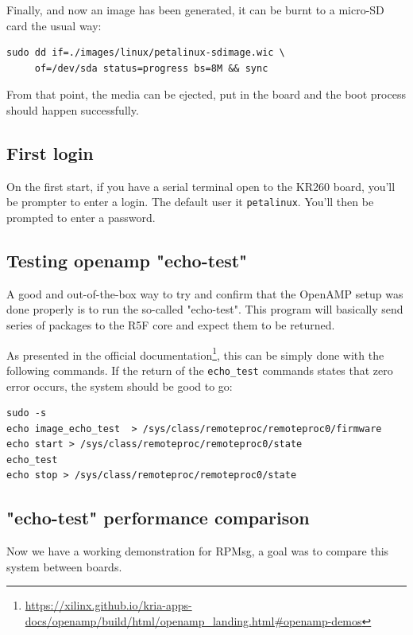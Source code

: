 \documentclass[10pt]{article}
\begin{document}
Finally, and now an image has been generated, it can be burnt to a micro-SD card the usual way:
\begin{verbatim}
sudo dd if=./images/linux/petalinux-sdimage.wic \
     of=/dev/sda status=progress bs=8M && sync
\end{verbatim}

From that point, the media can be ejected, put in the board and the boot process
should happen successfully.

\subsection{First login}
\label{sec:orgf9eb853}
On the first start, if you have a serial terminal open to the KR260 board, you'll be prompter to enter a login.
The default user it \texttt{petalinux}. You'll then be prompted to enter a password.

\subsection{Testing openamp "echo-test"}
\label{sec:orgdcf53da}
A good and out-of-the-box way to try and confirm that the OpenAMP setup was done
properly is to run the so-called "echo-test". This program will basically send
series of packages to the R5F core and expect them to be returned.

As presented in the official documentation\footnote{\url{https://xilinx.github.io/kria-apps-docs/openamp/build/html/openamp\_landing.html\#openamp-demos}}, this can be simply done with
the following commands. If the return of the \texttt{echo\_test} commands states that zero
error occurs, the system should be good to go:
\begin{verbatim}
sudo -s
echo image_echo_test  > /sys/class/remoteproc/remoteproc0/firmware
echo start > /sys/class/remoteproc/remoteproc0/state
echo_test
echo stop > /sys/class/remoteproc/remoteproc0/state
\end{verbatim}

\subsection{"echo-test" performance comparison}
\label{sec:org7880af4}

Now we have a working demonstration for RPMsg, a goal was to compare this system between boards.
\end{document}

